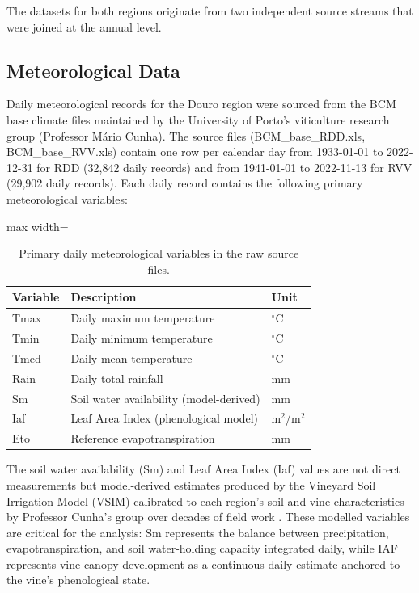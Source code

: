The datasets for both regions originate from two independent source streams that were joined at the annual level.


\subsection{Meteorological Data}\label{sub:meteorological_data}

Daily meteorological records for the Douro region were sourced from the BCM base climate files maintained by the University of Porto's viticulture research group (Professor Mário Cunha). The source files (BCM\_base\_RDD.xls, BCM\_base\_RVV.xls) contain one row per calendar day from 1933-01-01 to 2022-12-31 for RDD (32,842 daily records) and from 1941-01-01 to 2022-11-13 for RVV (29,902 daily records). Each daily record contains the following primary meteorological variables:

\begin{table}[htbp]
  \centering
  \caption{Primary daily meteorological variables in the raw source files.}\label{tab:ch3d_1}
  \small
  \begin{adjustbox}{max width=\textwidth}
    \begin{tabularx}{\textwidth}{llX}
    \toprule
    \textbf{Variable} & \textbf{Description} & \textbf{Unit} \\
    \midrule
    Tmax & Daily maximum temperature & $^\circ$C \\
    Tmin & Daily minimum temperature & $^\circ$C \\
    Tmed & Daily mean temperature & $^\circ$C \\
    Rain & Daily total rainfall & mm \\
    Sm   & Soil water availability (model-derived) & mm \\
    Iaf  & Leaf Area Index (phenological model) & m$^2$/m$^2$ \\
    Eto  & Reference evapotranspiration & mm \\
    \bottomrule
  \end{tabularx}
  \end{adjustbox}

\end{table}


The soil water availability (Sm) and Leaf Area Index (Iaf) values are not direct measurements but model-derived estimates produced by the Vineyard Soil Irrigation Model (VSIM) calibrated to each region's soil and vine characteristics by Professor Cunha's group over decades of field work \citep{Cunha2016}. These modelled variables are critical for the analysis: Sm represents the balance between precipitation, evapotranspiration, and soil water-holding capacity integrated daily, while IAF represents vine canopy development as a continuous daily estimate anchored to the vine's phenological state.


